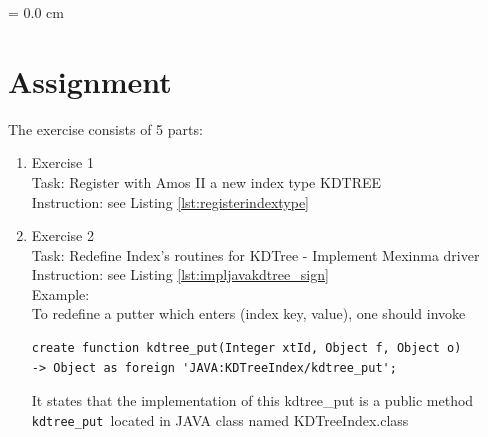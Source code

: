 \documentclass[12pt]{article}
\begin{document}
\headsep = 0.0 cm


\section{Assignment} \label{assignment}

The exercise consists of 5 parts:
\begin{enumerate}
\item Exercise 1\\
Task: Register with Amos II a new index type KDTREE\\
Instruction: see Listing \ref{lst:registerindextype}
\item  Exercise 2\\
Task: Redefine Index's routines for KDTree - Implement Mexinma driver\\
Instruction: see Listing \ref{lst:impljavakdtree_sign}\\
Example:\\
To redefine a putter which enters (index key, value), one should invoke \begin{verbatim}create function kdtree_put(Integer xtId, Object f, Object o)
-> Object as foreign 'JAVA:KDTreeIndex/kdtree_put';
\end{verbatim}
It states that the implementation of this kdtree\_put is a public method \texttt{kdtree\_put }located in JAVA class named KDTreeIndex.class


\end{enumerate}
\end{document}
